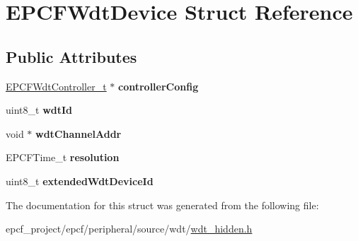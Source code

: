 \hypertarget{structEPCFWdtDevice}{}\section{E\+P\+C\+F\+Wdt\+Device Struct Reference}
\label{structEPCFWdtDevice}
\subsection*{Public Attributes}
\begin{DoxyCompactItemize}
\item 
\mbox{\label{structEPCFWdtDevice_a2af93e9810171207af4ce9969320ddf2}} 
\mbox{\hyperlink{structEPCFWdtController}{E\+P\+C\+F\+Wdt\+Controller\+\_\+t}} $\ast$ {\bfseries controller\+Config}
\item 
\mbox{\label{structEPCFWdtDevice_a05713950a93e742dc4355926b260c476}} 
uint8\+\_\+t {\bfseries wdt\+Id}
\item 
\mbox{\label{structEPCFWdtDevice_ae796091a62f31999b389bc4b1bac72bb}} 
void $\ast$ {\bfseries wdt\+Channel\+Addr}
\item 
\mbox{\label{structEPCFWdtDevice_aaa70499db34f3083bee0c21280146ac0}} 
E\+P\+C\+F\+Time\+\_\+t {\bfseries resolution}
\item 
\mbox{\label{structEPCFWdtDevice_aa1d2f4686b40cd7e7c4acbb24b62bf8f}} 
uint8\+\_\+t {\bfseries extended\+Wdt\+Device\+Id}
\end{DoxyCompactItemize}


The documentation for this struct was generated from the following file\+:\begin{DoxyCompactItemize}
\item 
epcf\+\_\+project/epcf/peripheral/source/wdt/\mbox{\hyperlink{wdt__hidden_8h}{wdt\+\_\+hidden.\+h}}\end{DoxyCompactItemize}

